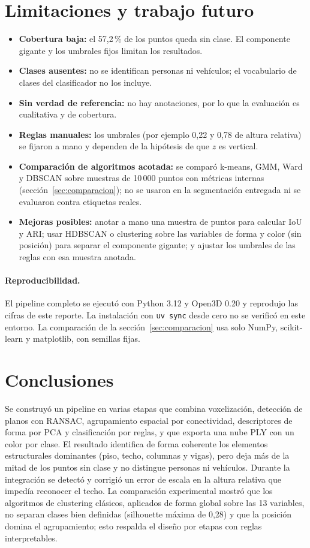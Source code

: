 \documentclass[11pt,a4paper]{article}
\begin{document}
\section{Limitaciones y trabajo futuro}
\begin{itemize}
\item \textbf{Cobertura baja:} el 57,2\,\% de los puntos queda sin clase. El componente gigante y los umbrales fijos limitan los resultados.
\item \textbf{Clases ausentes:} no se identifican personas ni vehículos; el vocabulario de clases del clasificador no los incluye.
\item \textbf{Sin verdad de referencia:} no hay anotaciones, por lo que la evaluación es cualitativa y de cobertura.
\item \textbf{Reglas manuales:} los umbrales (por ejemplo 0,22 y 0,78 de altura relativa) se fijaron a mano y dependen de la hipótesis de que $z$ es vertical.
\item \textbf{Comparación de algoritmos acotada:} se comparó k-means, GMM, Ward y DBSCAN sobre muestras de 10\,000 puntos con métricas internas (sección~\ref{sec:comparacion}); no se usaron en la segmentación entregada ni se evaluaron contra etiquetas reales.
\item \textbf{Mejoras posibles:} anotar a mano una muestra de puntos para calcular IoU y ARI; usar HDBSCAN o clustering sobre las variables de forma y color (sin posición) para separar el componente gigante; y ajustar los umbrales de las reglas con esa muestra anotada.
\end{itemize}
\paragraph{Reproducibilidad.} El pipeline completo se ejecutó con Python 3.12 y Open3D 0.20 y reprodujo las cifras de este reporte. La instalación con \texttt{uv sync} desde cero no se verificó en este entorno. La comparación de la sección~\ref{sec:comparacion} usa solo NumPy, scikit-learn y matplotlib, con semillas fijas.

\section{Conclusiones}
Se construyó un pipeline en varias etapas que combina voxelización, detección de planos con RANSAC, agrupamiento espacial por conectividad, descriptores de forma por PCA y clasificación por reglas, y que exporta una nube PLY con un color por clase. El resultado identifica de forma coherente los elementos estructurales dominantes (piso, techo, columnas y vigas), pero deja más de la mitad de los puntos sin clase y no distingue personas ni vehículos. Durante la integración se detectó y corrigió un error de escala en la altura relativa que impedía reconocer el techo. La comparación experimental mostró que los algoritmos de clustering clásicos, aplicados de forma global sobre las 13 variables, no separan clases bien definidas (silhouette máxima de 0,28) y que la posición domina el agrupamiento; esto respalda el diseño por etapas con reglas interpretables.
\end{document}
